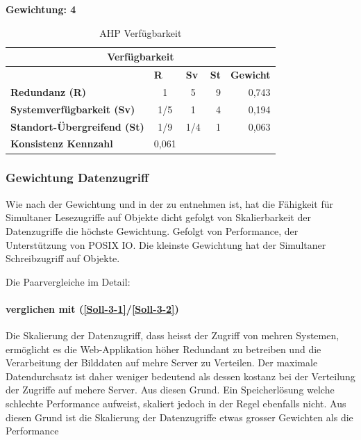 \textbf{Gewichtung: 4}

\begin{table}[htbp]
\caption{AHP Verfügbarkeit}
\begin{tabular}{|l|c|c|c|l|}
\hline
\multicolumn{ 5}{|c|}{\textbf{Verfügbarkeit}} \\ \hline
 & \multicolumn{1}{l|}{\textbf{R}} & \multicolumn{1}{l|}{\textbf{Sv}} & \textbf{St} & \textbf{Gewicht} \\ \hline
\textbf{Redundanz (R)} & 1 & 5 & \multicolumn{1}{r|}{9} & \multicolumn{1}{r|}{0,743} \\ \hline
\textbf{Systemverfügbarkeit (Sv)} & 1/5 & 1 & \multicolumn{1}{r|}{4} & \multicolumn{1}{r|}{0,194} \\ \hline
\textbf{Standort-Übergreifend (St)} & 1/9 & 1/4 & \multicolumn{1}{r|}{1} & \multicolumn{1}{r|}{0,063} \\ \hline
\textbf{Konsistenz Kennzahl} & 0,061 \\ \cline{1-2}
\end{tabular}
\label{tab:AHPVerfügbarkeit}
\end{table}

\subsubsection{Gewichtung Datenzugriff}

Wie nach der Gewichtung und in der  zu entnehmen ist, hat die Fähigkeit für Simultaner Lesezugriffe auf Objekte dicht gefolgt von Skalierbarkeit der Datenzugriffe die höchste Gewichtung. Gefolgt von Performance, der Unterstützung von POSIX IO. Die kleinste Gewichtung hat der Simultaner Schreibzugriff auf Objekte.


Die Paarvergleiche im Detail:

\paragraph*{ verglichen mit  (\ref{Soll-3-1}/\ref{Soll-3-2})}
Die Skalierung der Datenzugriff, dass heisst der Zugriff von mehren Systemen, ermöglicht es die Web-Applikation höher Redundant zu betreiben und die Verarbeitung der Bilddaten auf mehre Server zu Verteilen. Der maximale Datendurchsatz ist daher weniger bedeutend als dessen kostanz bei der Verteilung der Zugriffe auf mehere Server. Aus diesen Grund. Ein Speicherlösung welche schlechte Performance aufweist, skaliert jedoch in der Regel ebenfalls nicht. Aus diesen Grund ist die Skalierung der Datenzugriffe etwas grosser Gewichten als die Performance 

